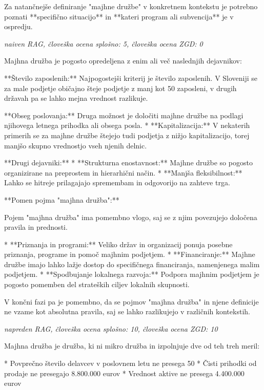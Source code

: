 \documentclass[a4paper,12pt,openright]{book}
\begin{document}
Za natančnejše definiranje "majhne družbe" v konkretnem kontekstu je potrebno poznati **specifično situacijo** in **kateri program ali subvencija** je v ospredju.

\vspace{0.5cm}
\textit{naiven RAG, človeška ocena splošno: 5, človeška ocena ZGD: 0}

Majhna družba je pogosto opredeljena z enim ali več naslednjih dejavnikov:

**Število zaposlenih:** Najpogostejši kriterij je število zaposlenih. V Sloveniji se za male podjetje običajno šteje podjetje z manj kot 50 zaposleni, v drugih državah pa se lahko mejna vrednost razlikuje.

**Obseg poslovanja:** Druga možnost je določiti majhne družbe na podlagi njihovega letnega prihodka ali obsega posla.
* **Kapitalizacija:** V nekaterih primerih se za majhne družbe štejejo tudi podjetja z nižjo kapitalizacijo, torej manjšo skupno vrednostjo vseh njenih delnic.

**Drugi dejavniki:**
* **Strukturna enostavnost:** Majhne družbe so pogosto organizirane na preprostem in hierarhični način.
* **Manjša fleksibilnost:** Lahko se hitreje prilagajajo spremembam in odgovorijo na zahteve trga.


**Pomen pojma "majhna družba":**

Pojem "majhna družba" ima pomembno vlogo, saj se z njim povezujejo določena pravila in prednosti.

* **Priznanja in programi:** Veliko držav in organizacij ponuja posebne priznanja, programe in pomoč majhnim podjetjem.
* **Financiranje:** Majhne družbe imajo lahko lažje dostop do specifičnega financiranja, namenjenega malim podjetjem.
* **Spodbujanje lokalnega razvoja:** Podpora majhnim podjetjem je pogosto pomemben del strateških ciljev lokalnih skupnosti.



V končni fazi pa je pomembno, da se pojmov "majhna družba" in njene definicije ne vzame kot absolutna pravila, saj se lahko razlikujejo v različnih kontekstih.

\vspace{0.5cm}
\textit{napreden RAG, človeška ocena splošno: 10, človeška ocena ZGD: 10}

Majhna družba je družba, ki ni mikro družba in izpolnjuje dve od teh treh meril:

* Povprečno število delavcev v poslovnem letu ne presega 50
* Čisti prihodki od prodaje ne presegajo 8.800.000 eurov
* Vrednost aktive ne presega 4.400.000 eurov
\end{document}
